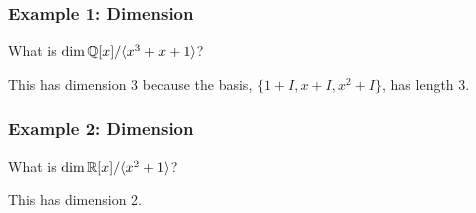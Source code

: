 \documentclass[letterpaper]{article}
\begin{document}
\subsubsection{Example 1: Dimension}
What is $\dim \mathbb{Q}[x] / \langle x^3 + x + 1 \rangle$? 

\begin{mdframed}[]
    This has dimension 3 because the basis, $\{1 + I, x + I, x^2 + I\}$, has length 3.
\end{mdframed}

\subsubsection{Example 2: Dimension}
What is $\dim \mathbb{R}[x] / \langle x^2 + 1 \rangle$? 

\begin{mdframed}[]
    This has dimension 2.
\end{mdframed}
\end{document}
